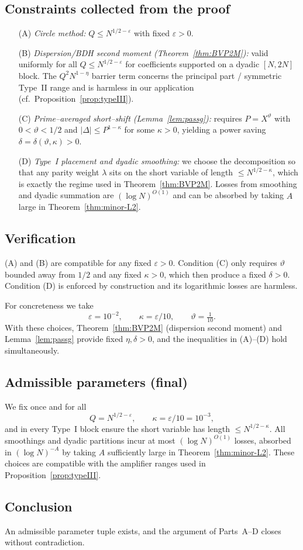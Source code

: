 \documentclass[11pt]{article}
\theoremstyle{definition}
\theoremstyle{remark}
\numberwithin{equation}{part}
\begin{document}
\subsection*{Constraints collected from the proof}
\begin{enumerate}
	\item[(A)] \emph{Circle method:} $Q\le N^{1/2-\varepsilon}$ with fixed $\varepsilon>0$.
	\item[(B)] \emph{Dispersion/BDH second moment (Theorem~\ref{thm:BVP2M}):}
	      valid uniformly for all $Q\le N^{1/2-\varepsilon}$ for coefficients supported on a dyadic $[N,2N]$ block. The $Q^2 N^{1-\eta}$ barrier term concerns the principal part / symmetric Type~II range and is harmless in our application (cf.\ Proposition~\ref{prop:typeIII}).
	\item[(C)] \emph{Prime–averaged short–shift (Lemma~\ref{lem:passg}):}
	      requires $P=X^{\vartheta}$ with $0<\vartheta<1/2$ and $|\Delta|\le P^{1-\kappa}$ for some $\kappa>0$, yielding a power saving $\delta=\delta(\vartheta,\kappa)>0$.
	\item[(D)] \emph{Type~I placement and dyadic smoothing:}
	      we choose the decomposition so that any parity weight $\lambda$ sits on the short variable of length $\le N^{1/2-\kappa}$, which is exactly the regime used in Theorem~\ref{thm:BVP2M}. Losses from smoothing and dyadic summation are $(\log N)^{O(1)}$ and can be absorbed by taking $A$ large in Theorem~\ref{thm:minor-L2}.
\end{enumerate}

\subsection*{Verification}
(A) and (B) are compatible for any fixed $\varepsilon>0$. Condition (C) only requires $\vartheta$ bounded away from $1/2$ and any fixed $\kappa>0$, which then produce a fixed $\delta>0$. Condition (D) is enforced by construction and its logarithmic losses are harmless.

For concreteness we take
\[
	\varepsilon=10^{-2},\qquad
	\kappa=\varepsilon/10,\qquad
	\vartheta=\tfrac{1}{10}.
\]
With these choices, Theorem~\ref{thm:BVP2M} (dispersion second moment) and Lemma~\ref{lem:passg} provide fixed $\eta,\delta>0$, and the inequalities in (A)–(D) hold simultaneously.

\subsection*{Admissible parameters (final)}
We fix once and for all
\[
	Q=N^{1/2-\varepsilon},\qquad \kappa=\varepsilon/10=10^{-3},
\]
and in every Type~I block ensure the short variable has length $\le N^{1/2-\kappa}$. All smoothings and dyadic partitions incur at most $(\log N)^{O(1)}$ losses, absorbed in $(\log N)^{-A}$ by taking $A$ sufficiently large in Theorem~\ref{thm:minor-L2}. These choices are compatible with the amplifier ranges used in Proposition~\ref{prop:typeIII}.

\subsection*{Conclusion}
An admissible parameter tuple exists, and the argument of Parts~A–D closes without contradiction.



\end{document}
